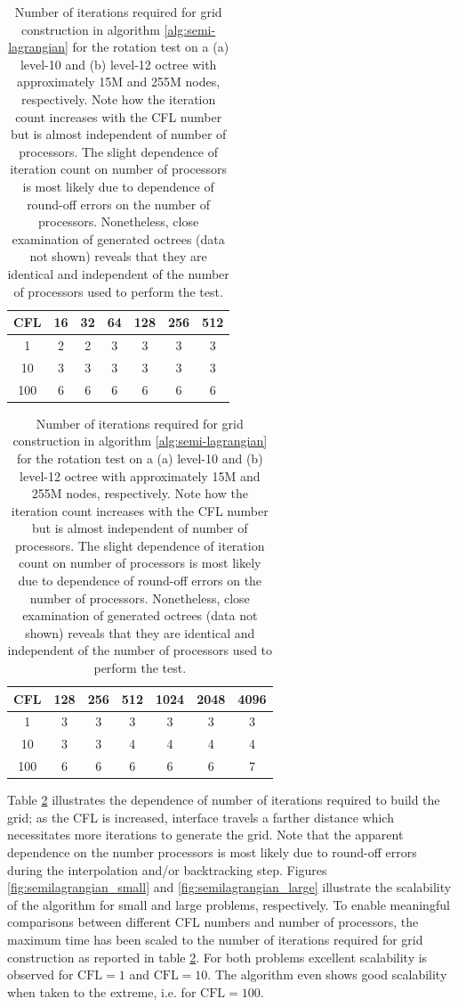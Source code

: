 \begin{table}[htbp]
	\begin{minipage}{.5\linewidth}
		\begin{center}
		\begin{tabular}{ccccccc}
			\hline
				CFL & 16 & 32 & 64 & 128 & 256 & 512 \\
				\hline
				1   & 2 & 2 & 3 & 3 & 3 & 3 \\
				10  & 3 & 3 & 3 & 3 & 3 & 3 \\
				100 & 6 & 6 & 6 & 6 & 6 & 6 \\
			\hline
		\end{tabular}
		\caption*{(a) $l_\text{max} = 10$}
		\end{center}
	\end{minipage}%
	\begin{minipage}{.5\linewidth}
		\begin{center}
		\begin{tabular}{ccccccc}
			\hline
				CFL & 128 & 256 & 512 & 1024 & 2048 & 4096 \\
			\hline
				1   & 3 & 3 & 3 & 3 & 3 & 3 \\
				10  & 3 & 3 & 4 & 4 & 4 & 4 \\
				100 & 6 & 6 & 6 & 6 & 6 & 7 \\
			\hline
		\end{tabular}
		\caption*{(b) $l_\text{max} = 12$}
		\end{center}
	\end{minipage}	
	\caption{Number of iterations required for grid construction in algorithm \ref{alg:semi-lagrangian} for the rotation test on a (a) level-10 and (b) level-12 octree with approximately 15M and 255M nodes, respectively. Note how the iteration count increases with the CFL number but is almost independent of number of processors. The slight dependence of iteration count on number of processors is most likely due to dependence of round-off errors on the number of processors. Nonetheless, close examination of generated octrees (data not shown) reveals that they are identical and independent of the number of processors used to perform the test.}
	\label{tab:semilagrangian}
\end{table}

Table \ref{tab:semilagrangian} illustrates the dependence of number of iterations required to build the grid; as the CFL is increased, interface travels a farther distance which necessitates more iterations to generate the grid. Note that the apparent dependence on the number processors is most likely due to round-off errors during the interpolation and/or backtracking step. Figures \ref{fig:semilagrangian_small} and \ref{fig:semilagrangian_large} illustrate the scalability of the algorithm for small and large problems, respectively. To enable meaningful comparisons between different CFL numbers and number of processors, the maximum time has been scaled to the number of iterations required for grid construction as reported in table \ref{tab:semilagrangian}. For both problems excellent scalability is observed for $\text{CFL} = 1$ and $\text{CFL} = 10$. The algorithm even shows good scalability when taken to the extreme, i.e. for $\text{CFL} = 100$.

